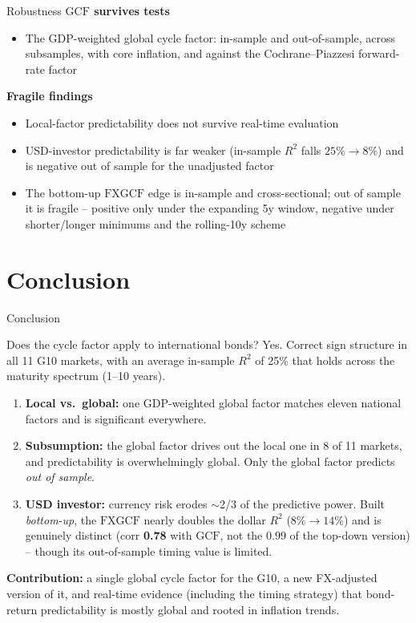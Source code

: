 \documentclass[10pt]{beamer}
\newcommand{\GCF}{\mathrm{GCF}}
\newcommand{\FXGCF}{\mathrm{FXGCF}}
\begin{document}
\begin{frame}{Robustness}
  \textbf{$\GCF$ survives tests}
  \begin{itemize}
    \item The GDP-weighted global cycle factor: in-sample and out-of-sample,
      across subsamples, with core inflation, and
      against the Cochrane--Piazzesi forward-rate factor
  \end{itemize}
  \vfill
  \textbf{Fragile findings}
  \begin{itemize}
    \item Local-factor predictability does not survive real-time evaluation
    \item USD-investor predictability is far weaker (in-sample $R^{2}$ falls
      $25\%\to8\%$) and is negative out of sample for the unadjusted factor
    \item The bottom-up $\FXGCF$ edge is in-sample and cross-sectional; out of
      sample it is fragile -- positive only under the expanding 5y window,
      negative under shorter/longer minimums and the rolling-10y scheme
  \end{itemize}
\end{frame}

\section{Conclusion}

\begin{frame}{Conclusion}
  \begin{block}{Does the \citet{cieslak2015} cycle factor apply to
      international bonds? Yes.}
    Correct sign structure in all 11 G10 markets, with an average in-sample
    $R^{2}$ of 25\% that holds across the maturity spectrum (1--10 years).
  \end{block}
  \begin{enumerate}
    \item \textbf{Local vs.\ global:} one GDP-weighted global factor matches
      eleven national factors and is significant everywhere.
    \item \textbf{Subsumption:} the global factor drives out the local one in
      8 of 11 markets, and predictability is overwhelmingly global. Only
      the global factor predicts \emph{out of sample}.
    \item \textbf{USD investor:} currency risk erodes $\sim$2/3 of the
      predictive power. Built \emph{bottom-up}, the $\FXGCF$ nearly doubles the
      dollar $R^{2}$ ($8\%\to14\%$) and is \alert{genuinely distinct} (corr
      \textbf{0.78} with $\GCF$, not the $0.99$ of the top-down version) --
      though its out-of-sample timing value is limited.
  \end{enumerate}
  \vfill
  \textbf{Contribution:} a single global cycle factor for the G10, a new
  FX-adjusted version of it, and real-time evidence (including the timing
  strategy) that bond-return predictability is mostly global and rooted in
  inflation trends.
\end{frame}
\end{document}

